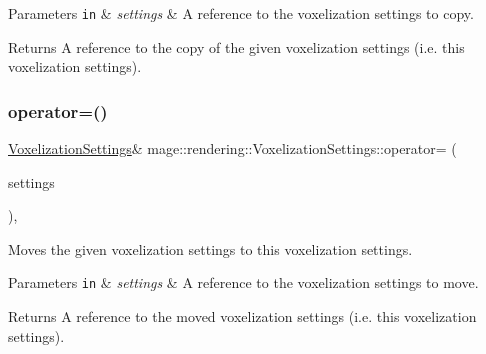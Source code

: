 \begin{DoxyParams}[1]{Parameters}
\mbox{\tt in}  & {\em settings} & A reference to the voxelization settings to copy. \\
\hline
\end{DoxyParams}
\begin{DoxyReturn}{Returns}
A reference to the copy of the given voxelization settings (i.\+e. this voxelization settings). 
\end{DoxyReturn}
\mbox{\label{classmage_1_1rendering_1_1_voxelization_settings_a95cb849852ead8fcde426ce85601061e}} 
\subsubsection{\texorpdfstring{operator=()}{operator=()}\hspace{0.1cm}{\footnotesize\ttfamily [2/2]}}
{\footnotesize\ttfamily \mbox{\hyperlink{classmage_1_1rendering_1_1_voxelization_settings}{Voxelization\+Settings}}\& mage\+::rendering\+::\+Voxelization\+Settings\+::operator= (\begin{DoxyParamCaption}\item[{\mbox{\hyperlink{classmage_1_1rendering_1_1_voxelization_settings}{Voxelization\+Settings}} \&\&}]{settings }\end{DoxyParamCaption})\hspace{0.3cm}{\ttfamily [default]}, {\ttfamily [noexcept]}}

Moves the given voxelization settings to this voxelization settings.


\begin{DoxyParams}[1]{Parameters}
\mbox{\tt in}  & {\em settings} & A reference to the voxelization settings to move. \\
\hline
\end{DoxyParams}
\begin{DoxyReturn}{Returns}
A reference to the moved voxelization settings (i.\+e. this voxelization settings). 
\end{DoxyReturn}
\mbox{\label{classmage_1_1rendering_1_1_voxelization_settings_a626f15dab0fa74a7b4e0435b64f0c024}} 
